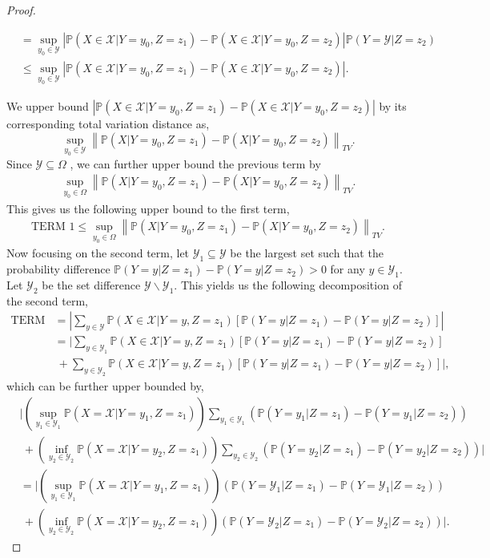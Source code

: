 \documentclass[opre,sglanonrev]{informs4}
\numberwithin{equation}{section}
\newcommand{\lp}{\left(}
\newcommand{\rp}{\right)}
\newcommand{\lb}{\left[}
\newcommand{\rb}{\right]}
\newcommand{\lv}{\left|}
\newcommand{\rv}{\right|}
\newcommand{\lV}{\left\|}
\newcommand{\rV}{\right\|}
\newcommand{\Pbb}{\mathbb{P}}
\newcommand{\Xcal}{\mathcal{X}}
\newcommand{\Ycal}{\mathcal{Y}}
\newcommand{\prob}{\Pbb}
\newcommand{\probl}{\prob}
\begin{document}
\begin{APPENDICES}
\begin{proof}
\begin{small}
\begin{align*}
    & = \sup_{y_0\in \Ycal} \lv \prob(X\in\Xcal|Y=y_0,Z=z_1)-\prob(X\in\Xcal|Y=y_0,Z=z_2)\rv \prob(Y=\Ycal|Z=z_2)\\
    & \leq  \sup_{y_0\in \Ycal} \lv \prob(X\in\Xcal|Y=y_0,Z=z_1)-\prob(X\in\Xcal|Y=y_0,Z=z_2)\rv.
\end{align*}
\end{small}
We upper bound $\lv\prob(X\in\Xcal|Y=y_0,Z=z_1)-\prob(X\in\Xcal|Y=y_0,Z=z_2)\rv$ by its corresponding total variation distance as,
\[
\sup_{y_0\in \Ycal} \lV \probl(X|Y=y_0,Z=z_1)-\probl(X|Y=y_0,Z=z_2)\rV_{TV}.
\]
Since $\Ycal\subseteq\Omega$ , we can further upper bound the previous term by 
\begin{align*}
    \sup_{y_0\in \Omega} \lV \probl(X|Y=y_0,Z=z_1)-\probl(X|Y=y_0,Z=z_2)\rV_{TV}.
\end{align*}
This gives us the following upper bound to the first term,
\begin{align}\label{eq:tv-eq1}
    \text{TERM 1}\leq \sup_{y_0\in \Omega} \lV \probl(X|Y=y_0,Z=z_1)-\probl(X|Y=y_0,Z=z_2)\rV_{TV}.
\end{align}
Now focusing on the second term, let $\Ycal_1\subseteq\Ycal$ be the largest set such that the probability difference $\prob\lp Y=y|Z=z_1\rp-\prob\lp Y=y|Z=z_2\rp>0$ for any $y\in\Ycal_1$. Let $\Ycal_2$ be the set difference $\Ycal\backslash\Ycal_1$.
This yields us the following decomposition of the second term,
\begin{align*}
    \text{TERM 2} & = \left| \sum_{y\in\Ycal}\prob(X\in\Xcal|Y=y,Z=z_1)\lb \prob(Y=y|Z=z_1)-\prob(Y=y|Z=z_2)\rb \right| \\
    & =\Bigg| \sum_{y\in\Ycal_1}\prob(X\in\Xcal|Y=y,Z=z_1)\lb \prob(Y=y|Z=z_1)-\prob(Y=y|Z=z_2)\rb\\
    & \ + \sum_{y\in\Ycal_2}\prob(X\in\Xcal|Y=y,Z=z_1)\lb \prob(Y=y|Z=z_1)-\prob(Y=y|Z=z_2)\rb \Bigg|, 
\end{align*}
which can be further upper bounded by,
\begin{align*}
    & \Bigg|\lp\sup_{y_1\in\Ycal_1}\prob(X=\Xcal|Y=y_1,Z=z_1)\rp \sum_{y_1\in\Ycal_1} \lp\prob(Y=y_1|Z=z_1)-\prob(Y=y_1|Z=z_2)\rp\\
    & \ +  \lp\inf_{y_2\in\Ycal_2}\prob(X=\Xcal|Y=y_2,Z=z_1)\rp \sum_{y_2\in\Ycal_2}\lp\prob(Y=y_2|Z=z_1)-\prob(Y=y_2|Z=z_2)\rp\Bigg|\\
    & = \Bigg|\lp\sup_{y_1\in\Ycal_1}\prob(X=\Xcal|Y=y_1,Z=z_1)\rp  \lp\prob(Y=\Ycal_1|Z=z_1)-\prob(Y=\Ycal_1|Z=z_2)\rp\\
    & \ +  \lp\inf_{y_2\in\Ycal_2}\prob(X=\Xcal|Y=y_2,Z=z_1)\rp\lp\prob(Y=\Ycal_2|Z=z_1)-\prob(Y=\Ycal_2|Z=z_2)\rp\Bigg|.

\end{align*}
\end{proof}
\end{APPENDICES}
\end{document}
